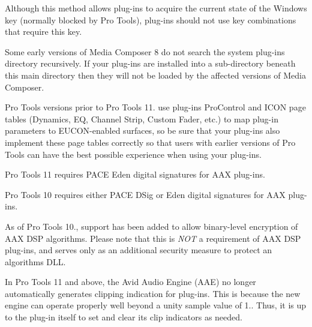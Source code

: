 \begin{DoxyRefList}
\item[\label{a00381__compatibility_notes000061}%
\hypertarget{a00381__compatibility_notes000061}{}%
Member \hyperlink{a00117_ac2fe16f6d81a8d941e36242d9f9d0980}{A\+A\+X\+\_\+\+I\+View\+Container\+:\+:Get\+Modifiers} (uint32\+\_\+t $\ast$out\+Modifiers)=0]Although this method allows plug-\/ins to acquire the current state of the Windows key (normally blocked by Pro Tools), plug-\/ins should not use key combinations that require this key. 
\item[\label{a00381__compatibility_notes000006}%
\hypertarget{a00381__compatibility_notes000006}{}%
Module \hyperlink{a00361}{A\+A\+X\+\_\+\+Media\+\_\+\+Composer\+\_\+\+Guide} ]Some early versions of Media Composer 8 do not search the system plug-\/ins directory recursively. If your plug-\/ins are installed into a sub-\/directory beneath this main directory then they will not be loaded by the affected versions of Media Composer. 
\item[\label{a00381__compatibility_notes000019}%
\hypertarget{a00381__compatibility_notes000019}{}%
Module \hyperlink{a00363}{A\+A\+X\+\_\+\+Page\+\_\+\+Table\+\_\+\+Guide} ]Pro Tools versions prior to Pro Tools 11. use plug-\/ins\textquotesingle{} Pro\+Control and I\+C\+O\+N page tables (Dynamics, E\+Q, Channel Strip, Custom Fader, etc.) to map plug-\/in parameters to E\+U\+C\+O\+N-\/enabled surfaces, so be sure that your plug-\/ins also implement these page tables correctly so that users with earlier versions of Pro Tools can have the best possible experience when using your plug-\/ins. 
\item[\label{a00381__compatibility_notes000010}%
\hypertarget{a00381__compatibility_notes000010}{}%
Module \hyperlink{a00360}{A\+A\+X\+\_\+\+Pro\+\_\+\+Tools\+\_\+\+Guide} ]Pro Tools 11 requires P\+A\+C\+E Eden digital signatures for A\+A\+X plug-\/ins.

Pro Tools 10 requires either P\+A\+C\+E D\+Sig or Eden digital signatures for A\+A\+X plug-\/ins.

As of Pro Tools 10., support has been added to allow binary-\/level encryption of A\+A\+X D\+S\+P algorithms. Please note that this is {\itshape N\+O\+T} a requirement of A\+A\+X D\+S\+P plug-\/ins, and serves only as an additional security measure to protect an algorithm\textquotesingle{}s D\+L\+L. 

In Pro Tools 11 and above, the Avid Audio Engine (A\+A\+E) no longer automatically generates clipping indication for plug-\/ins. This is because the new engine can operate properly well beyond a unity sample value of 1.. Thus, it is up to the plug-\/in itself to set and clear its clip indicators as needed.


\end{DoxyRefList}
